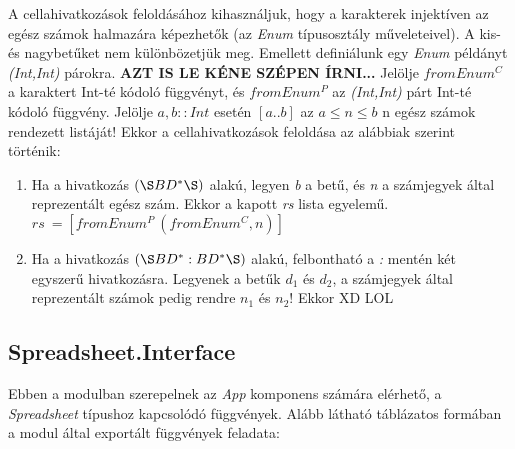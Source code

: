 A cellahivatkozások feloldásához kihasználjuk, hogy a karakterek injektíven az egész számok halmazára képezhetők (az \textit{Enum} típusosztály műveleteivel). A kis- és nagybetűket nem különbözetjük meg. Emellett definiálunk egy \textit{Enum} példányt \textit{(Int,Int)} párokra. \textbf{AZT IS LE KÉNE SZÉPEN ÍRNI...} Jelölje $fromEnum^C$ a karaktert Int-té kódoló függvényt, és $fromEnum^P$ az \textit{(Int,Int)} párt Int-té kódoló függvény. Jelölje $a,b :: Int$ esetén $[a..b]$ az $a \le n \le b$ n egész számok rendezett listáját! Ekkor a cellahivatkozások feloldása az alábbiak szerint történik:
\begin{enumerate}
	\item Ha a hivatkozás $(\S BD^*\S )$ alakú, legyen \textit{b} a betű, és \textit{n} a számjegyek által reprezentált egész szám. Ekkor a kapott  \textit{rs} lista egyelemű. $rs\ = [fromEnum^P\ (fromEnum^C,n)]$
	\item Ha a hivatkozás $(\S  BD^*:BD^*\S )$ alakú, felbontható a \textit{:} mentén két egyszerű hivatkozásra. Legyenek a betűk $d_1$ és $d_2$, a számjegyek által reprezentált számok pedig rendre $n_1$ és $n_2$! Ekkor XD LOL 
\end{enumerate}

\subsection{Spreadsheet.Interface}

Ebben a modulban szerepelnek az \textit{App} komponens számára elérhető, a \textit{Spreadsheet} típushoz kapcsolódó függvények. Alább látható táblázatos formában a modul által exportált függvények feladata:

